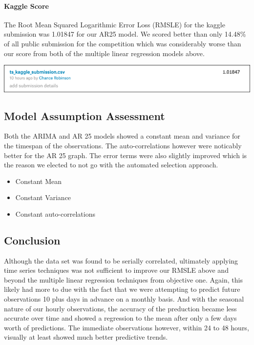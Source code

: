 \documentclass[american,]{article}
\providecommand{\tightlist}{%
  \setlength{\itemsep}{0pt}\setlength{\parskip}{0pt}}
\let\oldparagraph\paragraph
\renewcommand{\paragraph}[1]{\oldparagraph{#1}\mbox{}}
\begin{document}
\newpage

\hypertarget{kaggle-score-2}{%
\paragraph{Kaggle Score}\label{kaggle-score-2}}

The Root Mean Squared Logarithmic Error Loss (RMSLE) for the kaggle submission was 1.01847 for our AR25 model. We scored better than only 14.48\% of all public submission for the competition which was considerably worse than our score from both of the multiple linear regression models above.

\label{objective-two:ar25-kaggle}

\begin{center}\includegraphics[width=0.9\linewidth]{./images/time_series_ar25} \end{center}

\hypertarget{model-assumption-assessment}{%
\subsection{Model Assumption Assessment}\label{model-assumption-assessment}}

Both the ARIMA and AR 25 models showed a constant mean and variance for the timespan of the observations. The auto-correlations however were noticably better for the AR 25 graph. The error terms were also slightly improved which is the reason we elected to not go with the automated selection approach.

\begin{itemize}
\tightlist
\item
  Constant Mean
\item
  Constant Variance
\item
  Constant auto-correlations
\end{itemize}

\hypertarget{conclusion-1}{%
\subsection{Conclusion}\label{conclusion-1}}

Although the data set was found to be serially correlated, ultimately applying time series techniques was not sufficient to improve our RMSLE above and beyond the multiple linear regression techniques from objective one. Again, this likely had more to due with the fact that we were attempting to predict future observations 10 plus days in advance on a monthly basis. And with the seasonal nature of our hourly observations, the accuracy of the preduction became less accurate over time and showed a regression to the mean after only a few days worth of predictions. The immediate observations however, within 24 to 48 hours, visually at least showed much better predictive trends.
\end{document}
